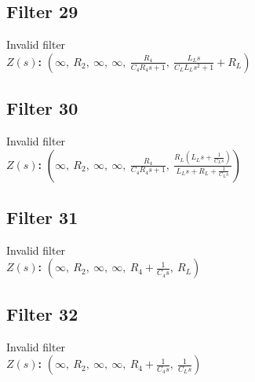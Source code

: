 \documentclass{article}
\begin{document}
\subsection*{Filter 29}
Invalid filter \\ 
\textbf{$Z(s)$:} $\left( \infty, \  R_{2}, \  \infty, \  \infty, \  \frac{R_{4}}{C_{4} R_{4} s + 1}, \  \frac{L_{L} s}{C_{L} L_{L} s^{2} + 1} + R_{L}\right)$ \\ 
\subsection*{Filter 30}
Invalid filter \\ 
\textbf{$Z(s)$:} $\left( \infty, \  R_{2}, \  \infty, \  \infty, \  \frac{R_{4}}{C_{4} R_{4} s + 1}, \  \frac{R_{L} \left(L_{L} s + \frac{1}{C_{L} s}\right)}{L_{L} s + R_{L} + \frac{1}{C_{L} s}}\right)$ \\ 
\subsection*{Filter 31}
Invalid filter \\ 
\textbf{$Z(s)$:} $\left( \infty, \  R_{2}, \  \infty, \  \infty, \  R_{4} + \frac{1}{C_{4} s}, \  R_{L}\right)$ \\ 
\subsection*{Filter 32}
Invalid filter \\ 
\textbf{$Z(s)$:} $\left( \infty, \  R_{2}, \  \infty, \  \infty, \  R_{4} + \frac{1}{C_{4} s}, \  \frac{1}{C_{L} s}\right)$ \\ 
\end{document}
